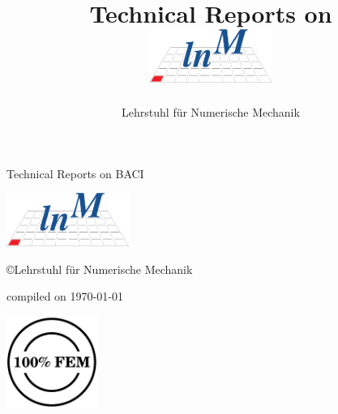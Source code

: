 \documentclass[a4paper,10pt]{book}
\title{Technical Reports on \baci{}\\
\vspace{2cm}
\includegraphics[width=0.3\textwidth]{templates/gfx/lnm-notext}
}
\author{Lehrstuhl f\"{u}r Numerische Mechanik}
\newcommand{\baci}{\textsc{BACI}}
\begin{document}
\frontmatter

\begin{titlepage}
\vspace{5cm}
\begin{center}
\huge{Technical Reports on \baci{}}

\vspace{2cm}

\includegraphics[width=0.3\textwidth]{templates/gfx/lnm-notext}

\vspace{2cm}

\copyright{}Lehrstuhl f\"{u}r Numerische Mechanik

\vspace{2cm}

\small{compiled on \today}

\vspace{10cm}
\begin{flushright}
\includegraphics[width=3cm,angle=7]{templates/gfx/hundredpercentfem}
\end{flushright}

\end{center}
\end{titlepage}

\tableofcontents

\mainmatter

\newpage
\end{document}
